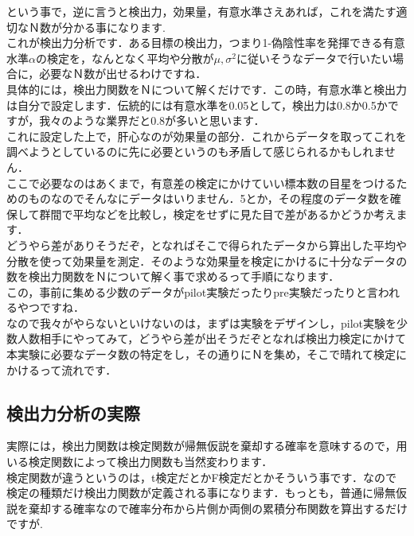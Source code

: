\documentclass[11pt,a4paper]{ujreport} 	%
\begin{document}
という事で，逆に言うと検出力，効果量，有意水準さえあれば，これを満たす適切なＮ数が分かる事になります.\\

これが検出力分析です．ある目標の検出力，つまり1-偽陰性率を発揮できる有意水準$\alpha$の検定を，なんとなく平均や分散が$\mu,\sigma^2$に従いそうなデータで行いたい場合に，必要なＮ数が出せるわけですね．\\

具体的には，検出力関数をＮについて解くだけです．この時，有意水準と検出力は自分で設定します．伝統的には有意水準を0.05として，検出力は0.8か0.5かですが，我々のような業界だと0.8が多いと思います．\\

これに設定した上で，肝心なのが効果量の部分．これからデータを取ってこれを調べようとしているのに先に必要というのも矛盾して感じられるかもしれません．\\

ここで必要なのはあくまで，有意差の検定にかけていい標本数の目星をつけるためのものなのでそんなにデータはいりません．5とか，その程度のデータ数を確保して群間で平均などを比較し，検定をせずに見た目で差があるかどうか考えます．\\

どうやら差がありそうだぞ，となればそこで得られたデータから算出した平均や分散を使って効果量を測定．そのような効果量を検定にかけるに十分なデータの数を検出力関数をＮについて解く事で求めるって手順になります．\\

この，事前に集める少数のデータがpilot実験だったりpre実験だったりと言われるやつですね．\\

なので我々がやらないといけないのは，まずは実験をデザインし，pilot実験を少数人数相手にやってみて，どうやら差が出そうだぞとなれば検出力検定にかけて本実験に必要なデータ数の特定をし，その通りにＮを集め，そこで晴れて検定にかけるって流れです．

\subsection{検出力分析の実際}
実際には，検出力関数は検定関数が帰無仮説を棄却する確率を意味するので，用いる検定関数によって検出力関数も当然変わります．\\

検定関数が違うというのは，t検定だとかF検定だとかそういう事です．なので検定の種類だけ検出力関数が定義される事になります．もっとも，普通に帰無仮説を棄却する確率なので確率分布から片側か両側の累積分布関数を算出するだけですが.\\
\end{document}
